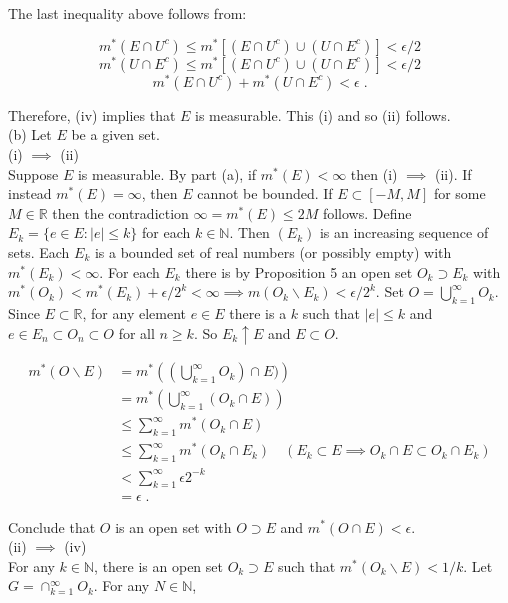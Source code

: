 \documentclass[a4paper]{article}
\begin{document}
The last inequality above follows from:

$$m^*(E \cap U^c) \leq m^*\left[(E\cap U^c)\cup (U \cap E^c)\right] < \epsilon /2 $$ 
$$m^*(U \cap E^c) \leq  m^*\left[(E\cap U^c)\cup (U \cap E^c)\right] < \epsilon /2 $$ 
$$m^*(E \cap U^c) + m^*(U\cap E^c) < \epsilon \;. $$

Therefore, (iv) implies that $E$ is measurable. This (i) and so (ii) follows. \\

(b) Let $E$ be a given set.\\

(i) $\implies$ (ii)\\
Suppose $E$ is measurable. By part (a), if $m^*(E) < \infty$ then (i) $\implies$ (ii). If instead $m^*(E) = \infty$, then $E$ cannot be bounded. If $E \subset [-M,M]$ for some $M \in \mathbb{R}$ then the contradiction $\infty = m^*(E) \leq 2M$ follows. Define $E_k = \{e \in E : |e| \leq k\}$ for each $k \in \mathbb{N}$. Then $(E_k)$ is an increasing sequence of sets. Each $E_k$ is a bounded set of real numbers (or possibly empty) with $m^*(E_k) < \infty$. For each $E_k$ there is by Proposition 5 an open set $O_k \supset E_k$ with $m^*(O_k) < m^*(E_k) + \epsilon/2^k < \infty \implies m(O_k \backslash E_k) < \epsilon /2^k$. Set $O = \bigcup_{k=1}^\infty O_k$. Since $E\subset \mathbb{R}$, for any element $e \in E$ there is a $k$ such that $|e| \leq k$ and $e \in E_n\subset O_n \subset O$ for all $n \geq k$. So $E_k \uparrow E$ and $E \subset O$. 

\begin{align*}
m^*(O \backslash E) &= m^*\left((\bigcup_{k=1}^\infty O_k) \cap E)\right) \\
&= m^*\left(\bigcup_{k=1}^\infty (O_k \cap E) \right)\\
&\leq \sum_{k=1}^\infty m^*(O_k \cap E) \\
&\leq \sum_{k=1}^\infty m^*(O_k \cap E_k) \quad (E_k \subset E \implies O_k \cap E \subset O_k \cap E_k)\\
&< \sum_{k=1}^\infty \epsilon 2^{-k} \\
& = \epsilon \; .
\end{align*}

Conclude that $O$ is an open set with $O \supset E$ and $m^*(O \cap E) < \epsilon$. \\

(ii) $\implies$ (iv)\\
For any $k \in \mathbb{N}$, there is an open set $O_k \supset E$ such that $m^*(O_k \backslash E) < 1/k$. Let $G = \cap_{k=1}^\infty O_k$. For any $N \in \mathbb{N}$,
\end{document}
